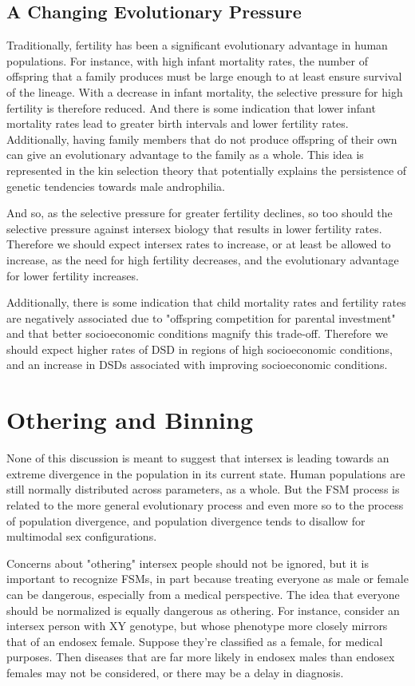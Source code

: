 \documentclass{article}
\begin{document}
\subsection{A Changing Evolutionary Pressure}
Traditionally, fertility has been a significant evolutionary advantage in human populations. For instance, with high infant mortality rates, the number of offspring that a family produces must be large enough to at least ensure survival of the lineage. With a decrease in infant mortality, the selective pressure for high fertility is therefore reduced. And there is some indication that lower infant mortality rates lead to greater birth intervals and lower fertility rates\cite{vanSoest2018}. Additionally, having family members that do not produce offspring of their own can give an evolutionary advantage to the family as a whole. This idea is represented in the kin selection theory that potentially explains the persistence of genetic tendencies towards male androphilia. 

And so, as the selective pressure for greater fertility declines, so too should the selective pressure against intersex biology that results in lower fertility rates. Therefore we should expect intersex rates to increase, or at least be allowed to increase, as the need for high fertility decreases, and the evolutionary advantage for lower fertility increases.

Additionally, there is some indication that child mortality rates and fertility rates are negatively associated due to "offspring competition for parental investment" and that better socioeconomic conditions magnify this trade-off\cite{Lawson2012}. Therefore we should expect higher rates of DSD in regions of high socioeconomic conditions, and an increase in DSDs associated with improving socioeconomic conditions. 
\section{Othering and Binning}
None of this discussion is meant to suggest that intersex is leading towards an extreme divergence in the population in its current state. Human populations are still normally distributed across parameters, as a whole. But the FSM process is related to the more general evolutionary process and even more so to the process of population divergence, and population divergence tends to disallow for multimodal sex configurations. 

Concerns about "othering" intersex people should not be ignored, but it is important to recognize FSMs, in part because treating everyone as male or female can be dangerous, especially from a medical perspective. The idea that everyone should be normalized is equally dangerous as othering. For instance, consider an intersex person with XY genotype, but whose phenotype more closely mirrors that of an endosex female. Suppose they're classified as a female, for medical purposes. Then diseases that are far more likely in endosex males than endosex females may not be considered, or there may be a delay in diagnosis.
\end{document}
